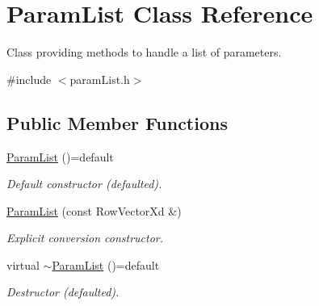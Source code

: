 \hypertarget{classParamList}{\section{Param\-List Class Reference}
\label{classParamList}
}


Class providing methods to handle a list of parameters.  




{\ttfamily \#include $<$param\-List.\-h$>$}

\subsection*{Public Member Functions}
\begin{DoxyCompactItemize}
\item 
\hypertarget{classParamList_a9e4b0ea6081bb500861f231f0b4f7900}{\hyperlink{classParamList_a9e4b0ea6081bb500861f231f0b4f7900}{Param\-List} ()=default}\label{classParamList_a9e4b0ea6081bb500861f231f0b4f7900}

\begin{DoxyCompactList}\small\item\em Default constructor (defaulted). \end{DoxyCompactList}\item 
\hyperlink{classParamList_a05bb961ce49e684edbae5f3f07f8b128}{Param\-List} (const Row\-Vector\-Xd \&)
\begin{DoxyCompactList}\small\item\em Explicit conversion constructor. \end{DoxyCompactList}\item 
\hypertarget{classParamList_a454ef9f83c9777b5c33cf273d88b3e5d}{virtual \hyperlink{classParamList_a454ef9f83c9777b5c33cf273d88b3e5d}{$\sim$\-Param\-List} ()=default}\label{classParamList_a454ef9f83c9777b5c33cf273d88b3e5d}

\begin{DoxyCompactList}\small\item\em Destructor (defaulted). \end{DoxyCompactList}\end{DoxyCompactItemize}
